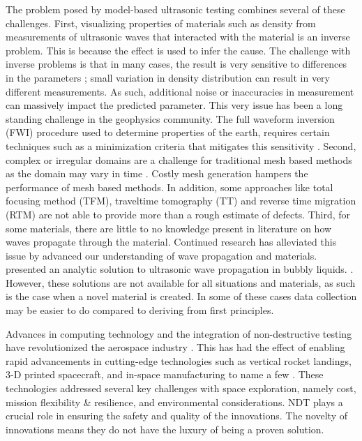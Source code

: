 The problem posed by model-based ultrasonic testing combines several of these challenges. First, visualizing properties of materials such as density from measurements of ultrasonic waves that interacted with the material is an inverse problem. This is because the effect is used to infer the cause. The challenge with inverse problems is that in many cases, the result is very sensitive to differences in the parameters \autocite{tarantolaInverseProblemTheory2005}; small variation in density distribution can result in very different measurements. As such, additional noise or inaccuracies in measurement can massively impact the predicted parameter. This very issue has been a long standing challenge in the geophysics community. The full waveform inversion (FWI) procedure used to determine properties of the earth, requires certain techniques such as a minimization criteria that mitigates this sensitivity \autocite{virieuxOverviewFullwaveformInversion2009}. Second, complex or irregular domains are a challenge for traditional mesh based methods as the domain may vary in time \autocite{liImmersedInterfaceMethod2006, burchnerImmersedBoundaryParametrizations2023}. Costly mesh generation hampers the performance of mesh based methods. In addition, some approaches like total focusing method (TFM), traveltime tomography (TT) and reverse time migration (RTM) are not able to provide more than a rough estimate of defects. Third, for some materials, there are little to no knowledge present in literature on how waves propagate through the material. Continued research has alleviated this issue by advanced our understanding of wave propagation and materials. \textcite{gordoaUltrasonicWavesBubbly2021} presented an analytic solution to ultrasonic wave propagation in bubbly liquids. \textcite{} . However, these solutions are not available for all situations and materials, as such is the case when a novel material is created. In some of these cases data collection may be easier to do compared to deriving from first principles. 

Advances in computing technology and the integration of non-destructive testing have revolutionized the aerospace industry \autocite{guptaAdvancesApplicationsNonDestructive2022, jacobDataFusionEfficient2022}. This has had the effect of enabling rapid advancements in cutting-edge technologies such as vertical rocket landings, 3-D printed spacecraft, and in-space manufacturing to name a few \autocite{corradoSpaceExplorationEconomic2023}. These technologies addressed several key challenges with space exploration, namely cost, mission flexibility \& resilience, and environmental considerations. NDT plays a crucial role in ensuring the safety and quality of the innovations. The novelty of innovations means they do not have the luxury of being a proven solution.

